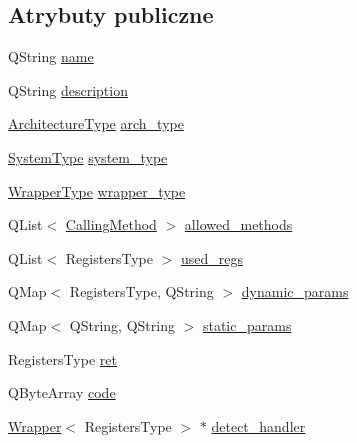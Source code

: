 \subsection*{Atrybuty publiczne}
\begin{DoxyCompactItemize}
\item 
Q\-String \hyperlink{class_d_adding_methods_1_1_wrapper_a41c5e8fdd7bde2f8610d2d499ae8f4b3}{name}
\item 
Q\-String \hyperlink{class_d_adding_methods_1_1_wrapper_a1f27a97876d639a2e39482c4a3a6d274}{description}
\item 
\hyperlink{class_d_adding_methods_a7d062c443c04f37689dbececc36cf4a3}{Architecture\-Type} \hyperlink{class_d_adding_methods_1_1_wrapper_aa4f2505d3abca144ceaae01692ab2982}{arch\-\_\-type}
\item 
\hyperlink{class_d_adding_methods_a14e87405d457c7c3671eca0e74b3f327}{System\-Type} \hyperlink{class_d_adding_methods_1_1_wrapper_ae298975da4ef638bef00c8277501eddc}{system\-\_\-type}
\item 
\hyperlink{class_d_adding_methods_1_1_wrapper_acb6db05ae66304ccd8b53c49221e0b09}{Wrapper\-Type} \hyperlink{class_d_adding_methods_1_1_wrapper_aaa1e1c8e0902c6241c714498dc9e5316}{wrapper\-\_\-type}
\item 
Q\-List$<$ \hyperlink{class_d_adding_methods_a8b52c07f1794d8c6cdd6f9b98be2bbf0}{Calling\-Method} $>$ \hyperlink{class_d_adding_methods_1_1_wrapper_a7365bd260c137feafcdc7abde67ffedc}{allowed\-\_\-methods}
\item 
Q\-List$<$ Registers\-Type $>$ \hyperlink{class_d_adding_methods_1_1_wrapper_aba0dc1a5f9addd4317b87e92fb2eb0db}{used\-\_\-regs}
\item 
Q\-Map$<$ Registers\-Type, Q\-String $>$ \hyperlink{class_d_adding_methods_1_1_wrapper_ac11ddb3500c96e6175c4b939cc726d4d}{dynamic\-\_\-params}
\item 
Q\-Map$<$ Q\-String, Q\-String $>$ \hyperlink{class_d_adding_methods_1_1_wrapper_a915ee3066596bebdc8f2c21c6cf5b9bc}{static\-\_\-params}
\item 
Registers\-Type \hyperlink{class_d_adding_methods_1_1_wrapper_ae7d3f4a32619b51a7f0f0e53fbc87d38}{ret}
\item 
Q\-Byte\-Array \hyperlink{class_d_adding_methods_1_1_wrapper_a1280984042d8167b8207d33488189415}{code}
\item 
\hyperlink{class_d_adding_methods_1_1_wrapper}{Wrapper}$<$ Registers\-Type $>$ $\ast$ \hyperlink{class_d_adding_methods_1_1_wrapper_aaa3fdb9659e74c099359cc0af48e4233}{detect\-\_\-handler}
\end{DoxyCompactItemize}
